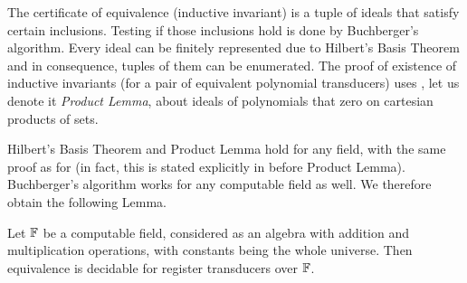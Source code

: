 The certificate of equivalence (inductive invariant) is a tuple of ideals that satisfy certain inclusions. Testing if those inclusions hold is done by Buchberger's algorithm. Every ideal can be finitely represented due to Hilbert's Basis Theorem and in consequence, tuples of them can be enumerated.
The proof of existence of inductive invariants (for a pair of equivalent polynomial transducers) uses \cite[Lemma 6.3]{seidlManethKemper2018}, let us denote it \emph{Product Lemma}, about ideals of polynomials that zero on cartesian products of sets.

 Hilbert's Basis Theorem and Product Lemma hold for any field, with the same proof as for \Q (in fact, this is stated explicitly in \cite{seidlManethKemper2018} before Product Lemma). Buchberger's algorithm works for any computable field as well. We therefore obtain the following Lemma.

\begin{lemma}\label{lem:equivalence-for-computable-field}
Let $\mathbb F$ be a computable field, considered as an algebra with addition and multiplication operations, with constants being the whole universe. Then equivalence is decidable for register transducers over $\mathbb F$.
\end{lemma}

